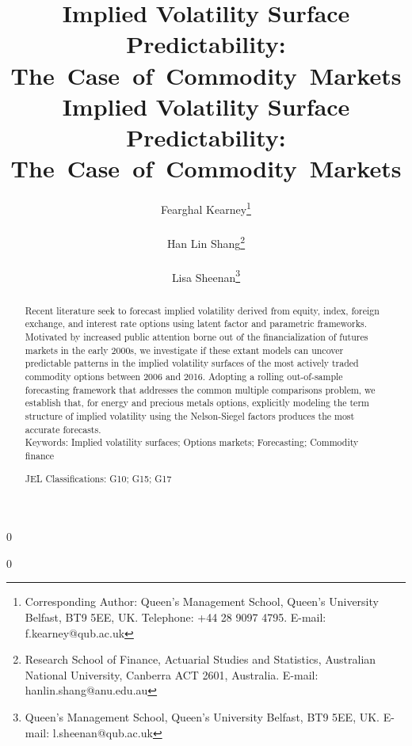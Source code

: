 \documentclass[12pt,a4paper]{article}
\newcommand{\blind}{0}
\begin{document}
\def\spacingset#1{\renewcommand{\baselinestretch}{#1}\small\normalsize} \spacingset{1}

\blind
{
  \title{\bf Implied Volatility Surface Predictability: \mbox{The Case of Commodity Markets}}
  \author{
  Fearghal Kearney\footnote{Corresponding Author: Queen\textquoteright s Management School, Queen\textquoteright s University Belfast, BT9 5EE, UK. Telephone: +44 28 9097 4795. E-mail: f.kearney@qub.ac.uk} \\
  \\
  Han Lin Shang\footnote{Research School of Finance, Actuarial Studies and Statistics, Australian National University, Canberra ACT 2601, Australia. E-mail: hanlin.shang@anu.edu.au} \\
  \\
  Lisa Sheenan\footnote{Queen\textquoteright s Management School, Queen\textquoteright s University Belfast, BT9 5EE, UK. E-mail: l.sheenan@qub.ac.uk}
  \\
 }
  \maketitle
} \fi

\blind
{
	\title{\bf Implied Volatility Surface Predictability: \mbox{The Case of Commodity Markets}}
\maketitle
} \fi


\bigskip
\begin{abstract}
Recent literature seek to forecast implied volatility derived from equity, index, foreign exchange, and interest rate options using latent factor and parametric frameworks. Motivated by increased public attention borne out of the financialization of futures markets in the early 2000s, we investigate if these extant models can uncover predictable patterns in the implied volatility surfaces of the most actively traded commodity options between 2006 and 2016. Adopting a rolling out-of-sample forecasting framework that addresses the common multiple comparisons problem, we establish that, for energy and precious metals options, explicitly modeling the term structure of implied volatility using the Nelson-Siegel factors produces the most accurate forecasts.
\\

\noindent Keywords: Implied volatility surfaces; Options markets; Forecasting; Commodity finance {\scriptsize{}\medskip{}}{\scriptsize \par}
\noindent JEL Classifications: G10; G15; G17{\scriptsize{}\bigskip{}}{\scriptsize \par}
\end{abstract}
\end{document}
